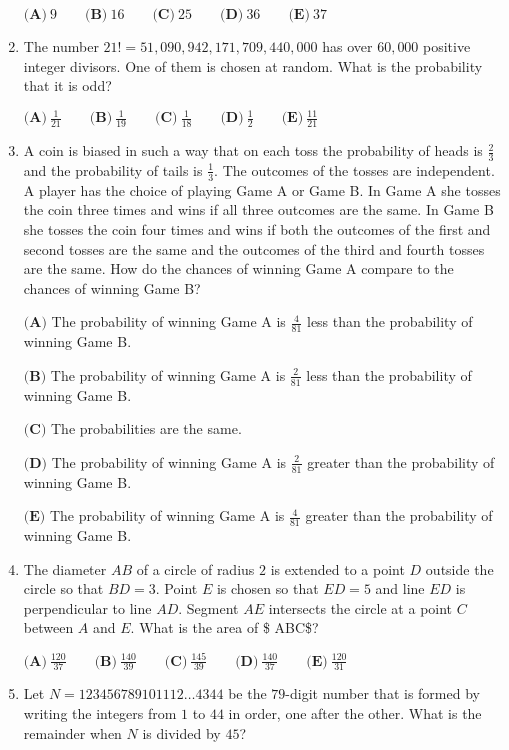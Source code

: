\documentclass{article}
\begin{document}
\begin{enumerate}[label=\arabic*., itemsep=0.5em]
$\textbf{(A)}\ 9\qquad\textbf{(B)}\ 16\qquad\textbf{(C)}\ 25\qquad\textbf{(D)}\ 36\qquad\textbf{(E)}\ 37$\par \vspace{0.5em}\item The number $21!=51,090,942,171,709,440,000$ has over $60,000$ positive integer divisors. One of them is chosen at random. What is the probability that it is odd?

$\textbf{(A)}\ \frac{1}{21} \qquad \textbf{(B)}\ \frac{1}{19} \qquad \textbf{(C)}\ \frac{1}{18} \qquad \textbf{(D)}\ \frac{1}{2} \qquad \textbf{(E)}\ \frac{11}{21}$\par \vspace{0.5em}\item A coin is biased in such a way that on each toss the probability of heads is $\frac{2}{3}$ and the probability of tails is $\frac{1}{3}$. The outcomes of the tosses are independent. A player has the choice of playing Game A or Game B. In Game A she tosses the coin three times and wins if all three outcomes are the same. In Game B she tosses the coin four times and wins if both the outcomes of the first and second tosses are the same and the outcomes of the third and fourth tosses are the same. How do the chances of winning Game A compare to the chances of winning Game B?

$\textbf{(A)}$ The probability of winning Game A is $\frac{4}{81}$ less than the probability of winning Game B.

$\textbf{(B)}$ The probability of winning Game A is $\frac{2}{81}$ less than the probability of winning Game B.

$\textbf{(C)}$ The probabilities are the same.

$\textbf{(D)}$ The probability of winning Game A is $\frac{2}{81}$ greater than the probability of winning Game B.

$\textbf{(E)}$ The probability of winning Game A is $\frac{4}{81}$ greater than the probability of winning Game B.\par \vspace{0.5em}\item The diameter $AB$ of a circle of radius $2$ is extended to a point $D$ outside the circle so that $BD=3$. Point $E$ is chosen so that $ED=5$ and line $ED$ is perpendicular to line $AD$. Segment $AE$ intersects the circle at a point $C$ between $A$ and $E$. What is the area of \$\triangle 
ABC\$?

$\textbf{(A)}\ \frac{120}{37}\qquad\textbf{(B)}\ \frac{140}{39}\qquad\textbf{(C)}\ \frac{145}{39}\qquad\textbf{(D)}\ \frac{140}{37}\qquad\textbf{(E)}\ \frac{120}{31}$\par \vspace{0.5em}\item Let $N=123456789101112\dots4344$ be the $79$-digit number that is formed by writing the integers from $1$ to $44$ in order, one after the other. What is the remainder when $N$ is divided by $45$?


\end{enumerate}
\end{document}
